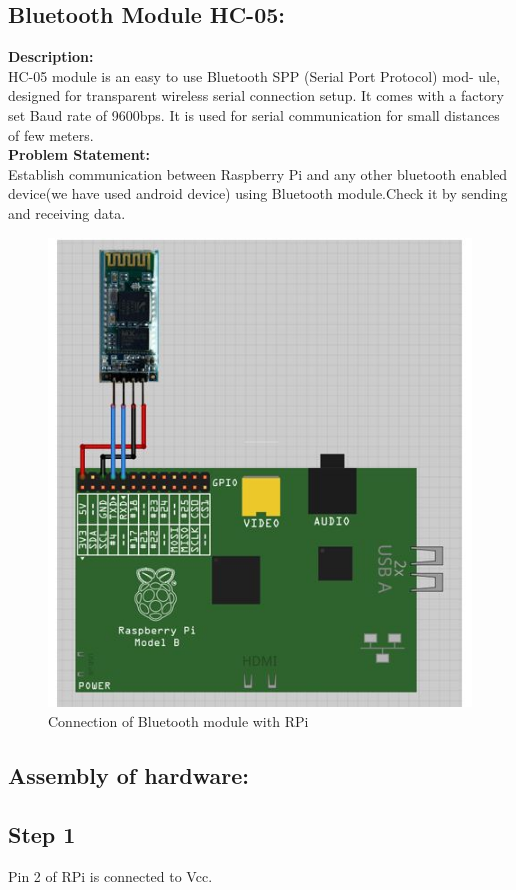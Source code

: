 \documentclass[a4paper,12pt,oneside]{book}
\begin{document}
\subsection{Bluetooth Module HC-05:}
\textbf{Description:} \\
HC-05 module is an easy to use Bluetooth SPP (Serial Port Protocol) mod-
ule, designed for transparent wireless serial connection setup. It comes with a factory set Baud rate of 9600bps. It is used for serial communication for small distances of few meters. \\
\textbf{Problem Statement:} \\
Establish communication between Raspberry Pi and any other bluetooth enabled device(we have used android device) using Bluetooth module.Check it by sending and receiving data.
\begin{figure}[H]
    \centering
    \includegraphics[scale= 0.4]{bluetooth}
    \caption{Connection of Bluetooth module with RPi}
\end{figure}
\subsection*{Assembly of hardware:}
\subsection*{Step 1}
Pin 2 of RPi is connected to Vcc.
\end{document}
